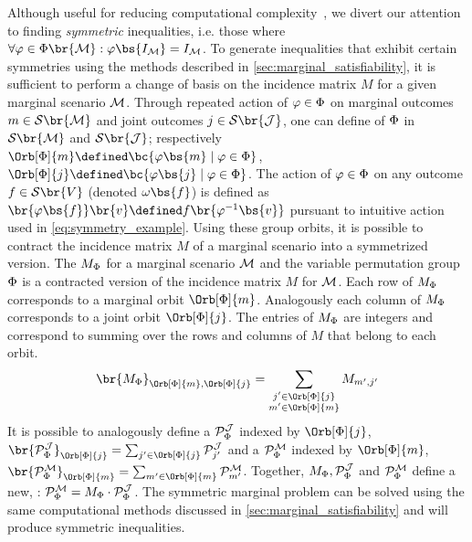 \documentclass[aps, 10pt, english, twoside, pra, nofootinbib, tightenlines, longbibliography, superscriptaddress]{revtex4-1}
\renewcommand{\Events}[1]{\mathcal{S}\br{#1}} %
\begin{document}
    Although useful for reducing computational complexity~\cite{Bancal_2010}, we divert our attention to finding \textit{symmetric} inequalities, i.e. those where $\forall \varphi \in \gp\br{\mscenario} :  \varphi\bs{I_{\mscenario}} = I_{\mscenario}$. To generate inequalities that exhibit certain symmetries using the methods described in \cref{sec:marginal_satisfiability}, it is sufficient to perform a change of basis on the incidence matrix $M$ for a given marginal scenario $\mathcal{M}$. Through repeated action of $\varphi \in \Phi$ on marginal outcomes $m \in \Events{\mscenario}$ and joint outcomes $j \in \Events{\jointvar}$, one can define  of $\Phi$ in $\Events{\mscenario}$ and $\Events{\jointvar}$; respectively $\Orb[\gp]{m} \defined \bc{\varphi\bs{m} \mid \varphi \in \gp}$, $\Orb[\gp]{j} \defined \bc{\varphi\bs{j} \mid \varphi \in \gp}$. The action of $\varphi \in \Phi$ on any outcome $f \in \Events{V}$ (denoted $\geo\bs{f}$) is defined as $\br{\varphi\bs{f}}\br{v} \defined f\br{\varphi^{-1}\bs{v}}$ pursuant to intuitive action used in \cref{eq:symmetry_example}. Using these group orbits, it is possible to contract the incidence matrix $M$ of a marginal scenario into a symmetrized version. The  $M_{\Phi}$ for a marginal scenario $\mathcal{M}$ and the variable permutation group $\Phi$ is a contracted version of the incidence matrix $M$ for $\mathcal{M}$. Each row of $M_{\Phi}$ corresponds to a marginal orbit $\Orb[\gp]{m}$. Analogously each column of $M_{\Phi}$ corresponds to a joint orbit $\Orb[\gp]{j}$. The entries of $M_{\Phi}$ are integers and correspond to summing over the rows and columns of $M$ that belong to each orbit.
    \[ \br{M_{\gp}}_{\Orb[\gp]{m}, \Orb[\gp]{j}} = \sum_{\substack{j' \in \Orb[\gp]{j} \\ m' \in \Orb[\gp]{m}}} M_{m',j'} \]
    It is possible to analogously define a  $\probvec^{\jointvar}_{\Phi}$ indexed by $\Orb[\gp]{j}$, $\br{\probvec^{\jointvar}_{\Phi}}_{\Orb[\gp]{j}} = \sum_{j' \in \Orb[\gp]{j}} \probvec^{\jointvar}_{j'}$ and a  $\probvec^{\mscenario}_{\Phi}$ indexed by $\Orb[\gp]{m}$, $\br{\probvec^{\mscenario}_{\Phi}}_{\Orb[\gp]{m}} = \sum_{m' \in \Orb[\gp]{m}} \probvec^{\mscenario}_{m'}$. Together, $M_{\gp}, \probvec^{\jointvar}_{\Phi}$ and $\probvec^{\mscenario}_{\Phi}$ define a new, : $\probvec^{\mscenario}_{\Phi} = M_{\gp} \cdot \probvec^{\jointvar}_{\Phi}$. The symmetric marginal problem can be solved using the same computational methods discussed in \cref{sec:marginal_satisfiability} and will produce symmetric inequalities.
\end{document}

